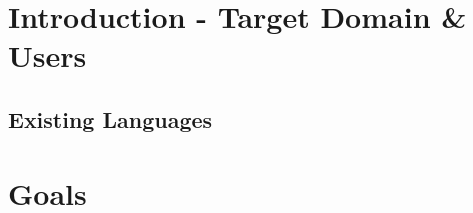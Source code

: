 

\section{Introduction - Target Domain \& Users} \label{sec:intro}

\subsection{Existing Languages}

\section{Goals} \label{sec:goals}

